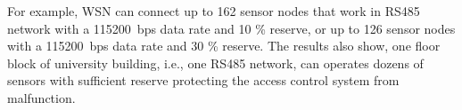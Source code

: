 For example, WSN can connect up to 162 sensor nodes that work in RS485 network with a 115200~bps data rate and 10 \% reserve, or up to 126 sensor nodes with a 115200~bps data rate and 30 \% reserve. The results also show, one floor block of university building, i.e., one RS485 network, can operates dozens of sensors with sufficient reserve protecting the access control system from malfunction.   











